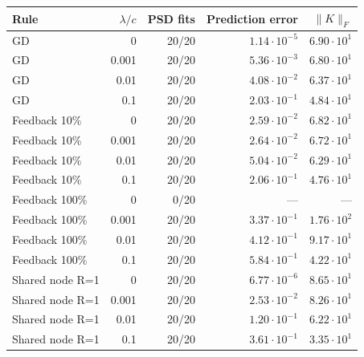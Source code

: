 \begin{tabular}{lrrrr}
\hline
Rule & $\lambda/c$ & PSD fits & Prediction error & $\|K\|_F$\\
\hline
GD & 0 & 20/20 & $1.14\cdot10^{-5}$ & $6.90\cdot10^{1}$\\
GD & 0.001 & 20/20 & $5.36\cdot10^{-3}$ & $6.80\cdot10^{1}$\\
GD & 0.01 & 20/20 & $4.08\cdot10^{-2}$ & $6.37\cdot10^{1}$\\
GD & 0.1 & 20/20 & $2.03\cdot10^{-1}$ & $4.84\cdot10^{1}$\\
Feedback 10\% & 0 & 20/20 & $2.59\cdot10^{-2}$ & $6.82\cdot10^{1}$\\
Feedback 10\% & 0.001 & 20/20 & $2.64\cdot10^{-2}$ & $6.72\cdot10^{1}$\\
Feedback 10\% & 0.01 & 20/20 & $5.04\cdot10^{-2}$ & $6.29\cdot10^{1}$\\
Feedback 10\% & 0.1 & 20/20 & $2.06\cdot10^{-1}$ & $4.76\cdot10^{1}$\\
Feedback 100\% & 0 & 0/20 & --- & ---\\
Feedback 100\% & 0.001 & 20/20 & $3.37\cdot10^{-1}$ & $1.76\cdot10^{2}$\\
Feedback 100\% & 0.01 & 20/20 & $4.12\cdot10^{-1}$ & $9.17\cdot10^{1}$\\
Feedback 100\% & 0.1 & 20/20 & $5.84\cdot10^{-1}$ & $4.22\cdot10^{1}$\\
Shared node R=1 & 0 & 20/20 & $6.77\cdot10^{-6}$ & $8.65\cdot10^{1}$\\
Shared node R=1 & 0.001 & 20/20 & $2.53\cdot10^{-2}$ & $8.26\cdot10^{1}$\\
Shared node R=1 & 0.01 & 20/20 & $1.20\cdot10^{-1}$ & $6.22\cdot10^{1}$\\
Shared node R=1 & 0.1 & 20/20 & $3.61\cdot10^{-1}$ & $3.35\cdot10^{1}$\\
\hline
\end{tabular}
